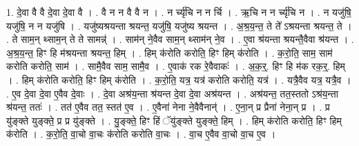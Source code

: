 \documentclass[17pt]{extarticle}
\begin{document}
1. दे॒वा वै वै दे॒वा दे॒वा वै । . वै न न वै वै न । . न र्च्यृ॑चि न न र्चि । . ऋ॒चि न न र्च्यृ॑चि न । . न यजु॑षि॒ यजु॑षि॒ न न यजु॑षि । . यजु॑ष्यश्रयन्ता श्रयन्त॒ यजु॑षि॒ यजु॑ष्य श्रयन्त । . अ॒श्र॒य॒न्त॒ ते ते᳚ ऽश्रयन्ता श्रयन्त॒ ते । . ते साम॒न् थ्साम॒न् ते ते सामन्न्॑ । . साम॑न् ने॒वैव साम॒न् थ्साम॑न् ने॒व । . ए॒वा श्र॑यन्ता श्रयन्तै॒वैवा श्र॑यन्त । . अ॒श्र॒य॒न्त॒ हिꣳ हि म॑श्रयन्ता श्रयन्त॒ हिम् । . हिम् क॑रोति करोति॒ हिꣳ हिम् क॑रोति । . क॒रो॒ति॒ साम॒ साम॑ करोति करोति॒ साम॑ । . सामै॒वैव साम॒ सामै॒व । . ए॒वाक॑ रक रे॒वैवाकः॑ । . अ॒क॒र्॒. हिꣳ हि म॑क रक॒र्॒. हिम् । . हिम् क॑रोति करोति॒ हिꣳ हिम् क॑रोति । . क॒रो॒ति॒ यत्र॒ यत्र॑ करोति करोति॒ यत्र॑ । . यत्रै॒वैव यत्र॒ यत्रै॒व । . ए॒व दे॒वा दे॒वा ए॒वैव दे॒वाः । . दे॒वा अश्र॑य॒न्ता श्र॑यन्त दे॒वा दे॒वा अश्र॑यन्त । . अश्र॑यन्त॒ तत॒स्ततो ऽश्र॑य॒न्ता श्र॑यन्त॒ ततः॑ । . तत॑ ए॒वैव तत॒ स्तत॑ ए॒व । . ए॒वैना॑ नेना ने॒वैवैनान्॑ । . ए॒ना॒न् प्र प्रैना॑ नेना॒न् प्र । . प्र यु॑ङ्क्ते युङ्क्ते॒ प्र प्र यु॑ङ्क्ते । . यु॒ङ्क्ते॒ हिꣳ हिं ॅयु॑ङ्क्ते युङ्क्ते॒ हिम् । . हिम् क॑रोति करोति॒ हिꣳ हिम् क॑रोति । . क॒रो॒ति॒ वा॒चो वा॒चः क॑रोति करोति वा॒चः । . वा॒च ए॒वैव वा॒चो वा॒च ए॒व । \newline
\end{document}
